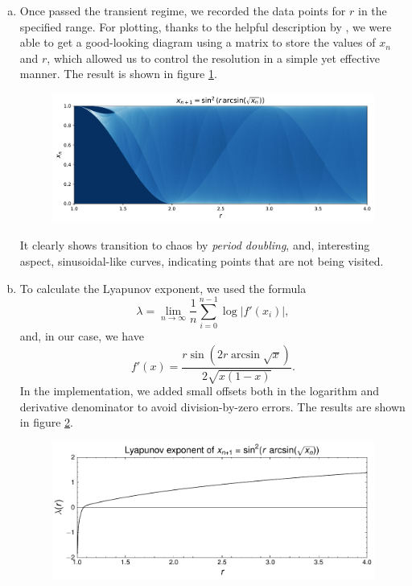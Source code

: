 \begin{enumerate}[(a)]

    \item Once passed the transient regime, we recorded the data points
    for $r$ in the specified range. For plotting, thanks to the helpful description
    by \cite{WikiTentMap}, we were able to get a good-looking diagram using a
    matrix to store the values of $x_n$ and $r$, which allowed us to control
    the resolution in a simple yet effective manner. The result is shown in figure
    \ref{fig:5a}.

    \begin{figure}[!ht]
        \centering
        \includegraphics[scale=0.65]{images/5a[1-4].pdf}
        \label{fig:5a}
    \end{figure}
    

    It clearly shows transition to chaos by \textit{period doubling}, and, interesting
    aspect, sinusoidal-like curves, indicating points that are not being visited.
    \item To calculate the Lyapunov exponent, we used the formula
    \[
        \lambda = \lim_{n \to \infty} \frac{1}{n} \sum_{i=0}^{n-1} \log{|f'(x_i)|},
    \]
    and, in our case, we have
    \[
        f'(x) = \frac{r\sin{\left(2r\arcsin{\sqrt{x}}\right)}}{2\sqrt{x(1-x)}}.
    \]
    In the implementation, we added small offsets both in the logarithm and 
    derivative denominator to avoid division-by-zero errors. The results are shown
    in figure \ref{fig:5b}.

    \begin{figure}[!ht]
        \centering
        \includegraphics[scale=0.75]{images/5b[1-4].pdf}
        \label{fig:5b}
    \end{figure}


\end{enumerate}

